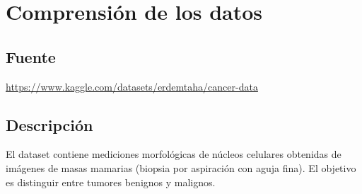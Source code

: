 \documentclass[12pt]{article}
\begin{document}
\section{Comprensión de los datos}

\subsection{Fuente}
\url{https://www.kaggle.com/datasets/erdemtaha/cancer-data}

\subsection{Descripción}
El dataset contiene mediciones morfológicas de núcleos celulares obtenidas de imágenes de masas mamarias (biopsia por aspiración con aguja fina). El objetivo es distinguir entre tumores benignos y malignos.
\end{document}
